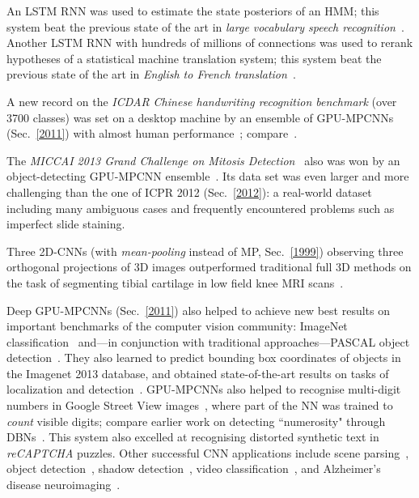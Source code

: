 \documentclass[letterpaper]{article}
\begin{document}
\begin{sloppypar}
An LSTM RNN was used to estimate the state posteriors of an HMM; this system
 beat the previous state of the art in {\em large vocabulary speech recognition}~\citep{sak2014,sak2014large}. 
Another LSTM RNN with hundreds of millions of connections was used to rerank hypotheses of a statistical machine translation system; this system
beat the previous state of the art in {\em English to French translation}~\citep{sutskever2014}.

A new record on the {\em ICDAR Chinese handwriting recognition 
benchmark} (over 3700 classes) was set on a desktop machine
by an ensemble of GPU-MPCNNs (Sec.~\ref{2011}) with almost human performance~\citep{chinese2013};
compare~\citep{icdar2013}.

The {\em MICCAI 2013 Grand Challenge on Mitosis Detection}~\citep{miccai13}
also was won by an object-detecting  GPU-MPCNN ensemble~\citep{miccai2013}.
Its data set was even larger and more challenging than the one of ICPR 2012 (Sec.~\ref{2012}): a real-world dataset including many ambiguous cases and frequently encountered problems such as imperfect slide staining. 

Three 2D-CNNs (with {\em mean-pooling} instead of MP, Sec.~\ref{1999}) observing three orthogonal projections of 3D images
outperformed traditional full 3D methods on the task of segmenting tibial
cartilage in low field knee MRI scans~\citep{prasoon:13}.
 


Deep GPU-MPCNNs (Sec.~\ref{2011}) also helped to achieve new best results
on important benchmarks of the computer vision community:
ImageNet classification~\citep{zeiler2013,szegedy2014} 
and---in 
conjunction with traditional 
approaches---PASCAL object detection~\citep{malik2013}.
They also learned to predict bounding box coordinates  of
 objects in the Imagenet 2013 database,
and obtained state-of-the-art results on tasks of localization and 
detection~\citep{sermanet2013}.
GPU-MPCNNs also helped to recognise
multi-digit numbers  in Google Street View images~\citep{goodfellow2014multi},
where part of the NN was trained to {\em count} visible digits;
compare earlier work on detecting ``numerosity" through DBNs~\citep{stoianov2012}.
This system also excelled at recognising distorted synthetic text in {\em reCAPTCHA} puzzles.
Other successful CNN applications include 
scene parsing~\citep{Farabet2013}, object detection~\citep{Szegedy2013},
shadow detection~\citep{khan2014},
video classification~\citep{karpathy2014},
and Alzheimer’s disease neuroimaging~\citep{shuiwang2014}.





\end{sloppypar}
\end{document}
